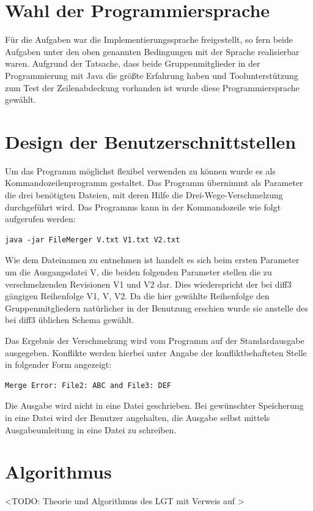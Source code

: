 \documentclass[a4paper,titlepage,12pt]{scrartcl}
\begin{document}
\section{Wahl der Programmiersprache}
\label{sec:proglang}
Für die Aufgaben war die Implementierungssprache freigestellt, so fern beide Aufgaben unter den oben genannten Bedingungen mit der Sprache realisierbar waren. Aufgrund der Tatsache, dass beide Gruppenmitglieder in der Programmierung mit Java die größte Erfahrung haben und Toolunterstützung zum Test der Zeilenabdeckung vorhanden ist wurde diese Programmiersprache gewählt.

\section{Design der Benutzerschnittstellen}
\label{sec:design}
Um das Programm möglichst flexibel verwenden zu können wurde es als Kommandozeilenprogramm gestaltet.
Das Programm übernimmt als Parameter die drei benötigten Dateien, mit deren Hilfe die Drei-Wege-Verschmelzung durchgeführt wird. Das Programms kann in der Kommandozeile wie folgt aufgerufen werden:

\lstset{language=sh, numbers=none, xleftmargin=0pt}
\begin{lstlisting}
java -jar FileMerger V.txt V1.txt V2.txt
\end{lstlisting}
Wie dem Dateinamen zu entnehmen ist handelt es sich beim ersten Parameter um die Ausgangsdatei V, die beiden folgenden Parameter stellen die zu verschmelzenden Revisionen V1 und V2 dar. Dies wiederspricht der bei diff3 gängigen Reihenfolge V1, V, V2. Da die hier gewählte Reihenfolge den Gruppenmitgliedern natürlicher in der Benutzung erschien wurde sie anstelle des bei diff3 üblichen Schema gewählt.

Das Ergebnis der Verschmelzung wird vom Programm auf der Standardausgabe ausgegeben. Konflikte werden hierbei unter Angabe der konfliktbehafteten Stelle in folgender Form angezeigt:

\begin{verbatim}
Merge Error: File2: ABC and File3: DEF
\end{verbatim}


Die Ausgabe wird nicht in eine Datei geschrieben. Bei gewünschter Speicherung in eine Datei wird der Benutzer angehalten, die Ausgabe selbst mittels Ausgabeumleitung in eine Datei zu schreiben.

\section{Algorithmus}
\label{sec:algorithm}
<TODO: Theorie und Algorithmus des LGT mit Verweis auf \citet{www:EP96}>
\end{document}
